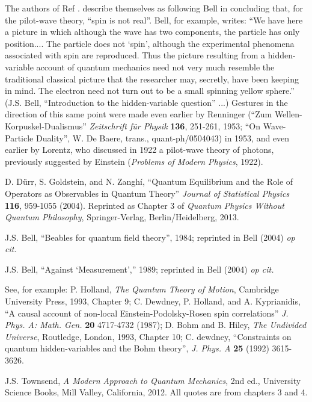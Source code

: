 \documentclass[aps,prc,onecolumn,letterpaper,floatfix,12pt]{revtex4}
\begin{document}
\begin{thebibliography}{99}
  The authors of Ref \cite{nrao}.  describe themselves
  as following Bell in concluding that, for the pilot-wave theory,
  ``spin is not real''.  Bell, for example, writes:  ``We have here a
  picture in which although the wave has two components, the particle
  has only position....  The particle does not `spin', although the
  experimental phenomena associated with spin are reproduced.  Thus
  the picture resulting from a hidden-variable account of quantum
  mechanics need not very much resemble the traditional classical
  picture that the researcher may, secretly, have been keeping in
  mind.  The electron need not turn out to be a small spinning yellow
  sphere.''  (J.S. Bell, ``Introduction to the hidden-variable
  question'' ...)  Gestures in the direction of this same point were
  made even earlier by Renninger
  (``Zum Wellen-Korpuskel-Dualismus'' \emph{Zeitschrift
    f\"ur Physik} {\bf{136}}, 251-261, 1953; ``On Wave-Particle
  Duality'', W. De Baere, trans., quant-ph/0504043) in 1953, and
  even
  earlier by Lorentz, who discussed in 1922 a pilot-wave theory of
  photons, previously suggested by Einstein (\emph{Problems of Modern
    Physics}, 1922).  





 D. D\"urr, S. Goldstein, and N. Zangh\'i, ``Quantum
  Equilibrium and the Role of Operators as Observables in Quantum
  Theory''  \emph{Journal of Statistical Physics} {\bf{116}}, 959-1055
  (2004).  Reprinted as Chapter 3 of \emph{Quantum Physics Without
    Quantum Philosophy}, Springer-Verlag, Berlin/Heidelberg, 2013.


  J.S. Bell, ``Beables for quantum field theory'',
  1984; reprinted in Bell (2004) \emph{op cit.}

 J.S. Bell, ``Against `Measurement','' 1989;
  reprinted in Bell (2004) \emph{op cit.}


  See, for example: 
P. Holland, \emph{The Quantum
    Theory of Motion}, Cambridge University Press, 1993, Chapter 9;
  C. Dewdney, P. Holland, and A. Kyprianidis, ``A causal account of
  non-local Einstein-Podolsky-Rosen spin correlations''
  \emph{J. Phys. A: Math. Gen.} {\bf{20}} 4717-4732 (1987); D. Bohm
  and B. Hiley, \emph{The Undivided Universe}, Routledge, London,
  1993, Chapter 10; C. dewdney, ``Constraints on quantum
  hidden-variables and the Bohm theory'', \emph{J. Phys. A} {\bf{25}}
  (1992) 3615-3626. 

  J.S. Townsend, \emph{A Modern Approach to Quantum
    Mechanics}, 2nd ed., University Science Books, Mill Valley,
  California, 2012.  All quotes are from chapters 3 and 4. 


\end{thebibliography}
\end{document}

